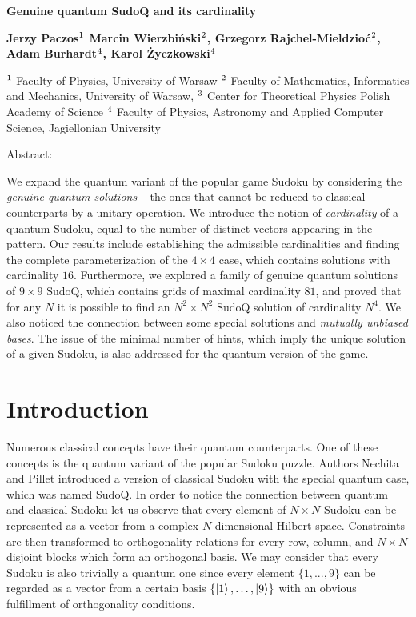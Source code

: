 \documentclass[11pt]{article}
\begin{document}
\begin{center}
{ \bf \Large 
Genuine quantum SudoQ and its cardinality
} \bigskip

{ \bf \large
	\bf{Jerzy Paczos}$^{\rm 1}$
	\bf{Marcin Wierzbiński}$^{\rm 2}$,
	\bf{Grzegorz Rajchel-Mieldzioć}$^{\rm 2}$,
	\bf{Adam Burhardt}$^{\rm 4}$,
	\bf{Karol Życzkowski}$^{\rm 4}$
} \bigskip

\begin{center}
$^{\rm 1}$ Faculty of Physics, University of Warsaw
$^{\rm 2}$ Faculty of Mathematics, Informatics and Mechanics, University of Warsaw,
$^{\rm 3}$ Center for Theoretical Physics Polish Academy of Science $^{\rm 4}$ Faculty of Physics, Astronomy and Applied Computer Science, Jagiellonian University
\end{center}
\end{center}

\bigskip

\begin{center}
    Abstract:
\end{center} 
We expand the quantum variant of the popular game Sudoku by considering the \emph{genuine quantum solutions} – the ones that cannot be reduced to classical counterparts by a unitary operation. We introduce the notion of \emph{cardinality} of a quantum Sudoku, equal to the number of distinct vectors appearing in the pattern.  Our results include establishing the admissible cardinalities and finding the complete parameterization of the $4\times 4$ case, which contains solutions with cardinality $16$. Furthermore, we explored a family of genuine quantum solutions of $9\times 9$ SudoQ, which contains grids of maximal cardinality $81$, and proved that for any $N$  it is possible to find an $N^2\times N^2$ SudoQ solution of cardinality $N^4$. We also noticed the connection between some special solutions and \emph{mutually unbiased bases}. The issue of the minimal number of hints, which imply the unique solution of a given Sudoku, is also addressed for the quantum version of the game.

\section{Introduction}
Numerous classical concepts have their quantum counterparts. One of these concepts is the quantum variant of the popular Sudoku puzzle. Authors Nechita and Pillet \cite{Nechita2020SudoQA} introduced a version of classical Sudoku with the special quantum case, which was named SudoQ. In order to notice the connection between quantum and classical Sudoku let us observe that every element of $N\times N$ Sudoku can be represented as a vector from a complex $N$-dimensional Hilbert space. Constraints are then transformed to orthogonality relations for every row, column, and $N \times N$ disjoint blocks which form an orthogonal basis. We may consider that every Sudoku is also trivially a quantum one since every element $\{1, ..., 9\}$ can be regarded as a vector from a certain basis $\{ \ket{1}, \ldots , \ket{9}\}$ with an obvious fulfillment of orthogonality conditions.
\end{document}
